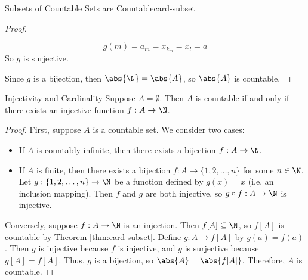 \begin{thmbox}{Subsets of Countable Sets are Countable}{card-subset}
\begin{proof}
\begin{itemize}
            \[ g(m) = a_m = x_{k_m} = x_l = a \]
            So $g$ is surjective.
        \end{itemize}
        Since $g$ is a bijection, then $\abs{\N} = \abs{A}$, so $\abs{A}$ is countable.
    \end{proof}
\end{thmbox}

\begin{thmbox}{Injectivity and Cardinality}{}
    Suppose $A = \emptyset$. Then $A$ is countable if and only if there exists an injective function $f : A \to \N$.
    \tcblower
    \begin{proof}
        First, suppose $A$ is a countable set. We consider two cases:
        \begin{itemize}
            \item If $A$ is countably infinite, then there exists a bijection $f : A \to \N$.
            \item If $A$ is finite, then there exists a bijection $f : A \to \{1,2,\ldots,n\}$ for some $n \in \N$. Let $g : \{1,2,\ldots,n\} \to \N$ be a function defined by $g(x) = x$ (i.e. an inclusion mapping). Then $f$ and $g$ are both injective, so $g \circ f : A \to \N $ is injective.
        \end{itemize}

        Conversely, suppose $f : A \to \N$ is an injection. Then $f[A] \subseteq \N$, so $f[A]$ is countable by Theorem \ref{thm:card-subset}. Define $g : A \to f[A]$ by $g(a) = f(a)$. Then $g$ is injective because $f$ is injective, and $g$ is surjective because $g[A] = f[A]$. Thus, $g$ is a bijection, so $\abs{A} = \abs{f[A]}$. Therefore, $A$ is countable.
    \end{proof}
\end{thmbox}

